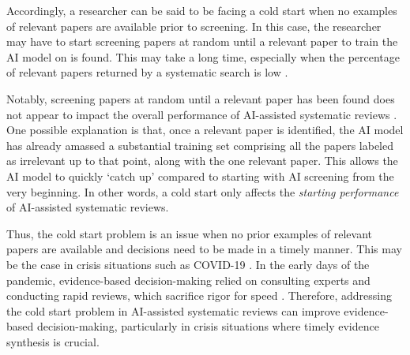 \documentclass[12pt]{article}
\begin{document}
Accordingly, a researcher can be said to be facing a cold start when no examples of relevant papers are available prior to screening. In this case, the researcher may have to start screening papers at random until a relevant paper to train the AI model on is found. This may take a long time, especially when the percentage of relevant papers returned by a systematic search is low \parencite{bastian2010seventy, borah2017analysis}.

Notably, screening papers at random until a relevant paper has been found does not appear to impact the overall performance of AI-assisted systematic reviews \parencite{oude2023can}. One possible explanation is that, once a relevant paper is identified, the AI model has already amassed a substantial training set comprising all the papers labeled as irrelevant up to that point, along with the one relevant paper. This allows the AI model to quickly `catch up' compared to starting with AI screening from the very beginning. In other words, a cold start only affects the \textit{starting performance} of AI-assisted systematic reviews. 

Thus, the cold start problem is an issue when no prior examples of relevant papers are available and decisions need to be made in a timely manner. This may be the case in crisis situations such as COVID-19 \parencite{funtowicz1994uncertainty, evans2022sage}. In the early days of the pandemic, evidence-based decision-making relied on consulting experts and conducting rapid reviews, which sacrifice rigor for speed \parencite{tricco2020rapid, kurzer2023follow}. Therefore, addressing the cold start problem in AI-assisted systematic reviews can improve evidence-based decision-making, particularly in crisis situations where timely evidence synthesis is crucial.




\end{document}

